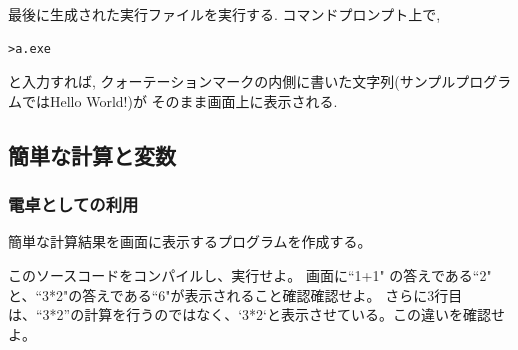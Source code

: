 \documentclass[a4j]{jsarticle}
\begin{document}
最後に生成された実行ファイルを実行する. コマンドプロンプト上で, 
\begin{Verbatim}[frame=single]
>a.exe
\end{Verbatim}
と入力すれば, クォーテーションマークの内側に書いた文字列(サンプルプログラムではHello World!)が
そのまま画面上に表示される. 

\subsection{簡単な計算と変数}
\subsubsection*{電卓としての利用}
簡単な計算結果を画面に表示するプログラムを作成する。

このソースコードをコンパイルし、実行せよ。
画面に``1+1" の答えである``2" と、``3*2"の答えである``6"が表示されること確認確認せよ。
さらに3行目は、``3*2”の計算を行うのではなく、`3*2`と表示させている。この違いを確認せよ。

\end{document}
